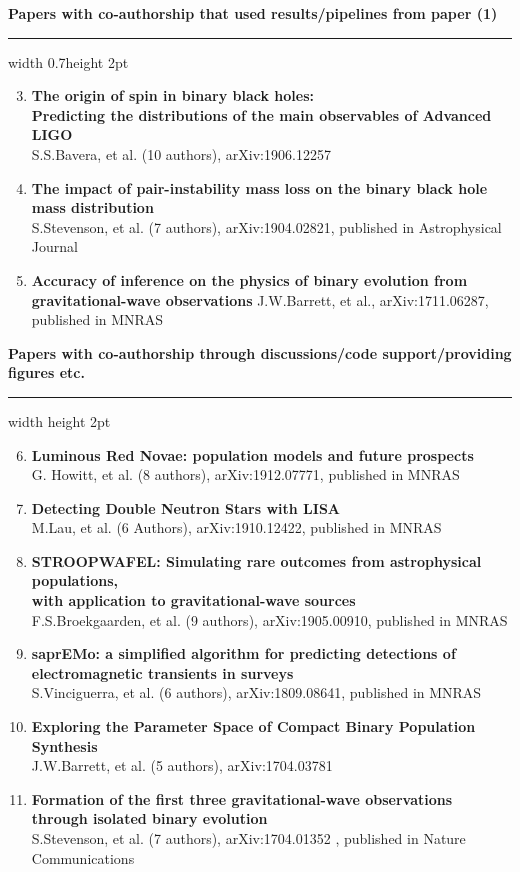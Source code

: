 \documentclass[]{res} %
\begin{document}
{\large \textbf{Papers with co-authorship that used results/pipelines from paper (1) }} 
{\color{lightgray}\hrule width 0.7\textwidth height 2pt}
\begin{enumerate}
\setcounter{enumi}{2}
\item \textbf{The origin of spin in binary black holes: \\ Predicting the distributions of the main observables of Advanced LIGO}\\
S.S.Bavera, et al. (10 authors), arXiv:1906.12257
\item \textbf{The impact of pair-instability mass loss on the binary black hole mass distribution}\\
S.Stevenson, et al. (7 authors), arXiv:1904.02821, published in Astrophysical Journal
\item \textbf{Accuracy of inference on the physics of binary evolution from gravitational-wave observations}
J.W.Barrett, et al., arXiv:1711.06287, published in MNRAS
\end{enumerate}

{\large \textbf{Papers with co-authorship through discussions/code support/providing figures etc.}} 
{\color{lightgray}\hrule width \textwidth height 2pt}
\begin{enumerate}
\setcounter{enumi}{5}
\item \textbf{Luminous Red Novae: population models and future prospects}\\
G. Howitt, et al. (8 authors), arXiv:1912.07771, published in MNRAS

\item \textbf{Detecting Double Neutron Stars with LISA}\\
M.Lau, et al. (6 Authors), arXiv:1910.12422, published in MNRAS

\item \textbf{STROOPWAFEL: Simulating rare outcomes from astrophysical populations,\\ with application to gravitational-wave sources}\\
F.S.Broekgaarden, et al. (9 authors), arXiv:1905.00910, published in MNRAS

\item \textbf{saprEMo: a simplified algorithm for predicting detections of \\ electromagnetic transients in surveys}\\
S.Vinciguerra, et al. (6 authors), arXiv:1809.08641, published in MNRAS

\item \textbf{Exploring the Parameter Space of Compact Binary Population Synthesis}\\
J.W.Barrett, et al. (5 authors), arXiv:1704.03781

\item \textbf{Formation of the first three gravitational-wave observations through isolated binary evolution}\\
S.Stevenson, et al. (7 authors), arXiv:1704.01352 , published in Nature Communications
\end{enumerate}
\end{document}
